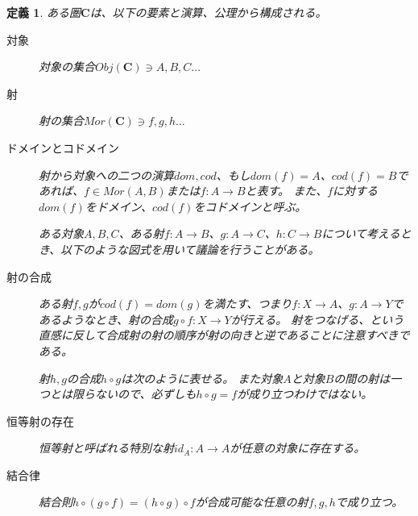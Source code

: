 \documentclass[dvipdfmx]{jsarticle}
\newcommand{\cat}[1]{\boldsymbol{#1}}
\newcommand{\arrow}{\rightarrow}
\newcommand{\obj}[1]{Obj(\cat{#1})}
\newcommand{\mor}[3]{#1:#2\arrow #3}
\newtheorem{define}{定義}[section]
\begin{document}
	\begin{define}
		ある圏$\cat{C}$は、以下の要素と演算、公理から構成される。
		\begin{description}
			\item[対象] 対象の集合$\obj{C}\ni A,B,C...$
			\item[射] 射の集合$Mor(\cat{C})\ni f,g,h...$
			\item[ドメインとコドメイン] 射から対象への二つの演算$dom,cod$、もし$dom(f)=A$、$cod(f)=B$であれば、$f\in Mor(A,B)$または$\mor{f}{A}{B}$と表す。
			また、$f$に対する$dom(f)$をドメイン、$cod(f)$をコドメインと呼ぶ。

			ある対象$A,B,C$、ある射$\mor{f}{A}{B}$、$\mor{g}{A}{C}$、$\mor{h}{C}{B}$について考えるとき、以下のような図式を用いて議論を行うことがある。
			\begin{center}
			\end{center}

			\item[射の合成] ある射$f,g$が$cod(f)=dom(g)$を満たす、つまり$\mor{f}{X}{A}$、$\mor{g}{A}{Y}$であるようなとき、射の合成$\mor{g\circ f}{X}{Y}$が行える。
			射をつなげる、という直感に反して合成射の射の順序が射の向きと逆であることに注意すべきである。

			射$h,g$の合成$h\circ g$は次のように表せる。
			また対象$A$と対象$B$の間の射は一つとは限らないので、必ずしも$h\circ g=f$が成り立つわけではない。
			\begin{center}
			\end{center}
			\item[恒等射の存在] 恒等射と呼ばれる特別な射$\mor{id_A}{A}{A}$が任意の対象に存在する。
			\item[結合律] 結合則$h\circ (g\circ f)=(h\circ g)\circ f$が合成可能な任意の射$f,g,h$で成り立つ。


\end{description}
\end{define}
\end{document}
